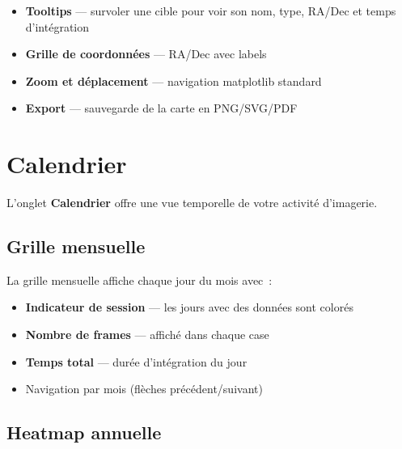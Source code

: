 \documentclass[a4paper,11pt]{article}
\begin{document}
\begin{itemize}
    \item \textbf{Tooltips} --- survoler une cible pour voir son nom, type, RA/Dec et temps d'int\'{e}gration
    \item \textbf{Grille de coordonn\'{e}es} --- RA/Dec avec labels
    \item \textbf{Zoom et d\'{e}placement} --- navigation matplotlib standard
    \item \textbf{Export} --- sauvegarde de la carte en PNG/SVG/PDF
\end{itemize}


\section{Calendrier}
\label{sec:calendrier}

\begin{tcolorbox}[
    enhanced, colback=successgreen!8, colframe=successgreen!60,
    coltitle=white, fonttitle=\bfseries,
    title={NOUVEAU dans v1.2.0}
]
L'onglet \textbf{Calendrier} offre une vue temporelle de votre activit\'{e} d'imagerie.
\end{tcolorbox}

\subsection{Grille mensuelle}

La grille mensuelle affiche chaque jour du mois avec~:

\begin{itemize}
    \item \textbf{Indicateur de session} --- les jours avec des donn\'{e}es sont color\'{e}s
    \item \textbf{Nombre de frames} --- affich\'{e} dans chaque case
    \item \textbf{Temps total} --- dur\'{e}e d'int\'{e}gration du jour
    \item Navigation par mois (fl\`{e}ches pr\'{e}c\'{e}dent/suivant)
\end{itemize}

\subsection{Heatmap annuelle}
\end{document}

